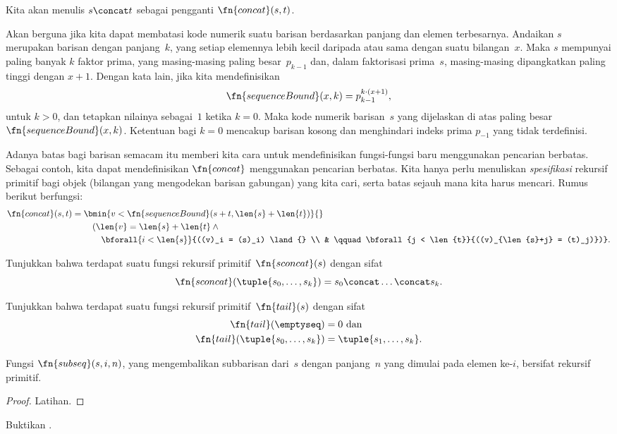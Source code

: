 \documentclass[../../../include/open-logic-section]{subfiles}
\begin{document}
Kita akan menulis $s \concat t$ sebagai pengganti $\fn{concat}(s,t)$.

Akan berguna jika kita dapat membatasi kode numerik suatu barisan berdasarkan
panjang dan elemen terbesarnya. Andaikan $s$ merupakan barisan dengan
panjang~$k$, yang setiap elemennya lebih kecil daripada atau sama dengan suatu
bilangan~$x$. Maka $s$ mempunyai paling banyak $k$ faktor prima, yang
masing-masing paling besar~$p_{k-1}$ dan, dalam faktorisasi prima~$s$,
masing-masing dipangkatkan paling tinggi dengan $x+1$. Dengan kata lain, jika
kita mendefinisikan
\[
\fn{sequenceBound}(x,k) = p_{k-1}^{k \cdot (x+1)},
\]
untuk $k>0$, dan tetapkan nilainya sebagai~$1$ ketika $k=0$. Maka kode numerik
barisan~$s$ yang dijelaskan di atas paling besar
$\fn{sequenceBound}(x,k)$. Ketentuan bagi $k=0$ mencakup barisan kosong dan
menghindari indeks prima $p_{-1}$ yang tidak terdefinisi.

Adanya batas bagi barisan semacam itu memberi kita cara untuk mendefinisikan
fungsi-fungsi baru menggunakan pencarian berbatas. Sebagai contoh, kita dapat
mendefinisikan $\fn{concat}$ menggunakan pencarian berbatas. Kita hanya perlu
menuliskan \emph{spesifikasi} rekursif primitif bagi objek (bilangan yang
mengodekan barisan gabungan) yang kita cari, serta batas sejauh mana kita
harus mencari. Rumus berikut berfungsi:
\begin{align*}
  \fn{concat}(s,t) = {} & \bmin{v < \fn{sequenceBound}(s+t,\len{s} +
    \len{t})}{} \\
  & \quad(\len{v} = \len{s} + \len{t} \land {}\\
    & \qquad \bforall{i < \len{s}}{((v)_i = (s)_i) \land {} \\
      & \qquad \bforall{j < \len{t}}{((v)_{\len{s}+j} = (t)_j)})}.
\end{align*}

\begin{prob}
Tunjukkan bahwa terdapat suatu fungsi rekursif primitif~$\fn{sconcat}(s)$
dengan sifat
\[
\fn{sconcat}(\tuple{s_0, \dots, s_k}) = s_0 \concat \dots \concat s_k.
\]
\end{prob}

\begin{prob}
Tunjukkan bahwa terdapat suatu fungsi rekursif primitif~$\fn{tail}(s)$
dengan sifat
\begin{align*}
  \fn{tail}(\emptyseq) & = 0 \text{ dan}\\
  \fn{tail}(\tuple{s_0, \dots, s_{k}}) & = \tuple{s_1, \dots, s_{k}}.
\end{align*}
\end{prob}

\begin{prop}
  Fungsi $\fn{subseq}(s,i,n)$, yang mengembalikan subbarisan dari~$s$ dengan
  panjang~$n$ yang dimulai pada elemen ke-$i$, bersifat rekursif primitif.
\end{prop}

\begin{proof}
  Latihan.
\end{proof}

\begin{prob}
  Buktikan .
\end{prob}
\end{document}
